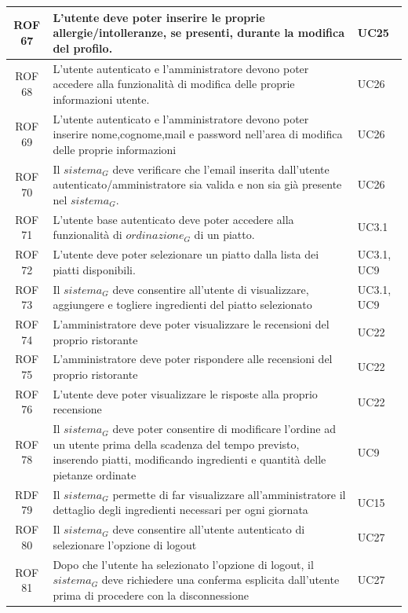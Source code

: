 \documentclass[12pt, oneside]{article}
\begin{document}
\begin{longtable}{|c|p{14cm}|p{2cm}|}
    \hline
    ROF 67 & L'utente deve poter inserire le proprie allergie/intolleranze, se presenti, durante la modifica del profilo.  & UC25  \\
    \hline
    ROF 68 & L'utente autenticato e l'amministratore devono poter accedere alla funzionalità di modifica delle proprie informazioni utente.  & UC26  \\
    \hline
    ROF 69 & L'utente autenticato e l'amministratore devono poter inserire nome,cognome,mail e password nell'area di  modifica delle proprie informazioni  & UC26  \\
    \hline
    ROF 70 & Il $\textit{sistema}_G$ deve verificare che l'email inserita dall'utente autenticato/amministratore sia valida e non sia già presente nel $\textit{sistema}_G$.  & UC26  \\
    \hline
    ROF 71 & L'utente base autenticato deve poter accedere alla funzionalità di $\textit{ordinazione}_G$ di un piatto.  & UC3.1  \\
    \hline
    ROF 72 & L'utente deve poter selezionare un piatto dalla lista dei piatti disponibili.  & UC3.1, UC9  \\
    \hline
    ROF 73 & Il $\textit{sistema}_G$ deve consentire all'utente di visualizzare, aggiungere e togliere ingredienti del piatto selezionato  & UC3.1, UC9  \\
    \hline
    ROF 74 & L'amministratore deve poter visualizzare le recensioni del proprio ristorante & UC22 \\ 
    \hline
    ROF 75 & L'amministratore deve poter rispondere alle recensioni del proprio ristorante & UC22 \\
    \hline
    ROF 76 & L'utente deve poter visualizzare le risposte alla proprio recensione & UC22 \\
    \hline
    ROF 78 & Il $\textit{sistema}_G$ deve poter consentire di modificare l'ordine ad un utente prima della scadenza del tempo previsto, inserendo piatti, modificando ingredienti e quantità delle pietanze ordinate & UC9 \\
    \hline
    RDF 79 & Il $\textit{sistema}_G$ permette di far visualizzare all'amministratore il dettaglio degli ingredienti necessari per ogni giornata & UC15 \\
    \hline
    ROF 80 & Il $\textit{sistema}_G$ deve consentire all'utente autenticato di selezionare l'opzione di logout & UC27 \\
    \hline
    ROF 81 & Dopo che l'utente ha selezionato l'opzione di logout, il $\textit{sistema}_G$ deve richiedere una conferma esplicita dall'utente prima di procedere con la disconnessione & UC27 \\ 

\end{longtable}
\end{document}
